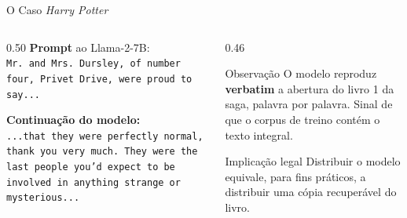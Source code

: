 \documentclass[aspectratio=169,xcolor=dvipsnames]{beamer}
\begin{document}
  \begin{frame}{O Caso \textit{Harry Potter}}
    \begin{columns}[T]
      \begin{column}{0.50\textwidth}
        \textbf{Prompt} ao Llama-2-7B:\\[0.2em]
        \texttt{\small Mr. and Mrs. Dursley, of number four, Privet Drive, were proud to say...}

        \vspace{0.6em}
        \textbf{Continuação do modelo:}\\[0.2em]
        \texttt{\small ...that they were perfectly normal, thank you very much. They were the last people you'd expect to be involved in anything strange or mysterious...}
      \end{column}
      \begin{column}{0.46\textwidth}
        \begin{alertblock}{Observação}
          O modelo reproduz \textbf{verbatim} a abertura do livro 1 da saga, palavra por palavra. Sinal de que o corpus de treino contém o texto integral.
        \end{alertblock}

        \vspace{0.3em}
        \begin{block}{Implicação legal}
          Distribuir o modelo equivale, para fins práticos, a distribuir uma cópia recuperável do livro.
        \end{block}
      \end{column}
    \end{columns}
  \end{frame}
\end{document}
